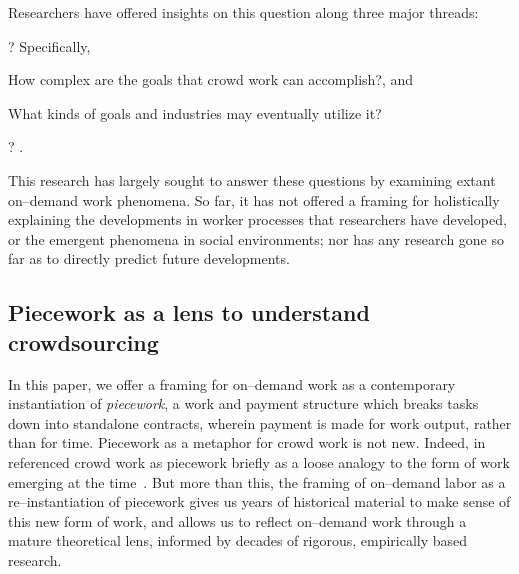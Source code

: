 \documentclass[trackingWork]{subfiles}
\begin{document}
Researchers have offered insights on this question along three major threads:
\begin{numberlist}[itemjoin*={;~and~},itemjoin={;~}]
  \item {}?
        Specifically,
        \begin{inlinelist}[label=(\alph*)]
          \item How complex are the goals that crowd work can accomplish?, and
          \item What kinds of goals and industries may eventually utilize it?
        \end{inlinelist}
        \cite{foundry,suzukiAtelier,KimStoria,yuanAlmost,YuEncouragingOutside,
              Nebeling:2016:WCW:2858036.2858169,
              Hahn:2016:KAB:2858036.2858364}
  \item {}
        \cite{embracingErrorKrishna,bernsteinSoylent,sensitiveTasks,
              LykourentzouPersonalityMatters,KucherbaevReLauncher,
              Law:2016:CKC:2858036.2858144,Cai:2016:CRI:2858036.2858237,
              Chang:2016:ACC:2858036.2858411,Newell:2016:OMA:2858036.2858490}
  \item {}?
        \cite{turkopticon,storiesIraniSilberman,dynamo,crowdcollab,
              whyWouldAnyoneBrewer,takingAHITMcInnis}.
\end{numberlist}

This research has largely sought to answer these questions by examining extant on--demand work phenomena.
So far, it has not offered a framing for holistically explaining
the developments in worker processes that researchers have developed, or
the emergent phenomena in social environments;
nor has any research
gone so far as to directly predict future developments.

\subsection{Piecework as a lens to understand crowdsourcing}
In this paper, we offer a framing for on--demand work as a contemporary instantiation of \textit{piecework},
a work and payment structure which breaks tasks down into standalone contracts,
wherein payment is made for work output, rather than for time.
Piecework as a metaphor for crowd work is not new.
Indeed,
\citeauthor{crowdworkFuture} in \citeyear{crowdworkFuture}
referenced crowd work as piecework briefly
as a loose analogy to the form of work emerging at the time~\cite{crowdworkFuture}.
But more than this,
the framing of on--demand labor as a re--instantiation of piecework
gives us years of historical material to make sense of this new form of work, and allows us to reflect on--demand work through a mature theoretical lens, informed by decades of rigorous, empirically based research.
\end{document}
